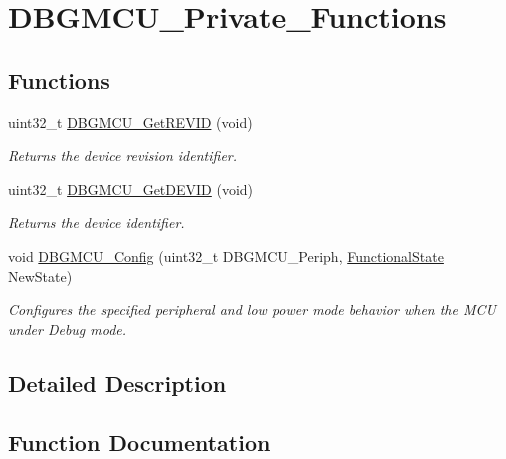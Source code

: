 \hypertarget{group___d_b_g_m_c_u___private___functions}{}\section{D\+B\+G\+M\+C\+U\+\_\+\+Private\+\_\+\+Functions}
\label{group___d_b_g_m_c_u___private___functions}
\subsection*{Functions}
\begin{DoxyCompactItemize}
\item 
uint32\+\_\+t \mbox{\hyperlink{group___d_b_g_m_c_u___private___functions_ga47419e9ca75ab7be4c70feb82faa0511}{D\+B\+G\+M\+C\+U\+\_\+\+Get\+R\+E\+V\+ID}} (void)
\begin{DoxyCompactList}\small\item\em Returns the device revision identifier. \end{DoxyCompactList}\item 
uint32\+\_\+t \mbox{\hyperlink{group___d_b_g_m_c_u___private___functions_gac34193c34dbce759bf424957a31b3266}{D\+B\+G\+M\+C\+U\+\_\+\+Get\+D\+E\+V\+ID}} (void)
\begin{DoxyCompactList}\small\item\em Returns the device identifier. \end{DoxyCompactList}\item 
void \mbox{\hyperlink{group___d_b_g_m_c_u___private___functions_gadf2f267f855ac1e4c03905c5dcfbd28b}{D\+B\+G\+M\+C\+U\+\_\+\+Config}} (uint32\+\_\+t D\+B\+G\+M\+C\+U\+\_\+\+Periph, \mbox{\hyperlink{group___exported__types_gac9a7e9a35d2513ec15c3b537aaa4fba1}{Functional\+State}} New\+State)
\begin{DoxyCompactList}\small\item\em Configures the specified peripheral and low power mode behavior when the M\+CU under Debug mode. \end{DoxyCompactList}\end{DoxyCompactItemize}


\subsection{Detailed Description}


\subsection{Function Documentation}
\mbox{\label{group___d_b_g_m_c_u___private___functions_gadf2f267f855ac1e4c03905c5dcfbd28b}} 
